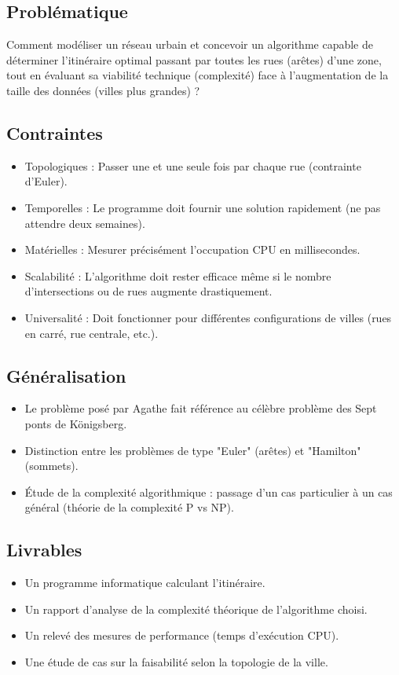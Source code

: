 \subsection*{Problématique}
{}
\noindent Comment modéliser un réseau urbain et concevoir un algorithme capable de déterminer l'itinéraire optimal passant par toutes les rues (arêtes) d'une zone, tout en évaluant sa viabilité technique (complexité) face à l'augmentation de la taille des données (villes plus grandes) ?

\subsection*{Contraintes}
{}
\begin{itemize}
	\item Topologiques : Passer une et une seule fois par chaque rue (contrainte d'Euler).
	\item Temporelles : Le programme doit fournir une solution rapidement (ne pas attendre deux semaines).
	\item Matérielles : Mesurer précisément l'occupation CPU en millisecondes.
	\item Scalabilité : L'algorithme doit rester efficace même si le nombre d'intersections ou de rues augmente drastiquement.
	\item Universalité : Doit fonctionner pour différentes configurations de villes (rues en carré, rue centrale, etc.).
\end{itemize}

\subsection*{Généralisation}
{}
\begin{itemize}
	\item Le problème posé par Agathe fait référence au célèbre problème des Sept ponts de Königsberg.
	\item Distinction entre les problèmes de type "Euler" (arêtes) et "Hamilton" (sommets).
	\item Étude de la complexité algorithmique : passage d'un cas particulier à un cas général (théorie de la complexité P vs NP).
\end{itemize}

\subsection*{Livrables}
{}
\begin{itemize}
	\item Un programme informatique calculant l'itinéraire.
	\item Un rapport d'analyse de la complexité théorique de l'algorithme choisi.
	\item Un relevé des mesures de performance (temps d'exécution CPU).
	\item Une étude de cas sur la faisabilité selon la topologie de la ville.
\end{itemize}

